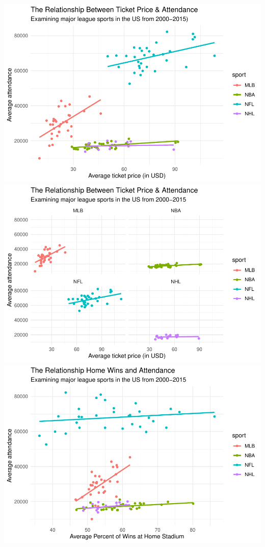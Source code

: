 \documentclass[man, fleqn, noextraspace,floatsintext]{apa6}
\begin{document}
\includegraphics{Final_Project_files/figure-latex/plots-1.pdf}
\includegraphics{Final_Project_files/figure-latex/plots-2.pdf}
\includegraphics{Final_Project_files/figure-latex/plots-3.pdf}
\end{document}
